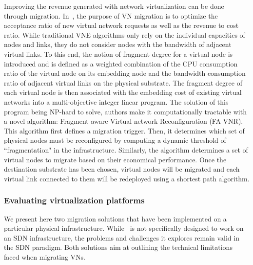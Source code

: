Improving the revenue generated with network virtualization can be done through migration.
In~\cite{fragment-Liu2018}, the purpose of VN migration is to optimize the acceptance ratio of new virtual network requests as well as the revenue to cost ratio.
While traditional VNE algorithms only rely on the individual capacities of nodes and links, they do not consider nodes with the bandwidth of adjacent virtual links.
To this end, the notion of fragment degree for a virtual node is introduced and is defined as a weighted combination of the CPU consumption ratio of the virtual node on its embedding node and the bandwidth consumption ratio of adjacent virtual links on the physical substrate.
The fragment degree of each virtual node is then associated with the embedding cost of existing virtual networks into a multi-objective integer linear program. The solution of this program being NP-hard to solve, authors make it computationally tractable with a novel algorithm: Fragment-aware Virtual network Reconfiguration (FA-VNR).
This algorithm first defines a migration trigger. 
Then, it determines which set of physical nodes must be reconfigured by computing a dynamic threshold of ``fragmentation" in the infrastructure.
Similarly, the algorithm determines a set of virtual nodes to migrate based on their economical performance.
Once the destination substrate has been chosen, virtual nodes will be migrated and each virtual link connected to them will be redeployed using a shortest path algorithm.

\subsubsection{Evaluating virtualization platforms}
We present here two migration solutions that have been implemented on a particular physical infrastructure.
While~\cite{Lo2014} is not specifically designed to work on an SDN infrastructure, the problems and challenges it explores remain valid in the SDN paradigm.
Both solutions aim at outlining the technical limitations faced when migrating VNs.

